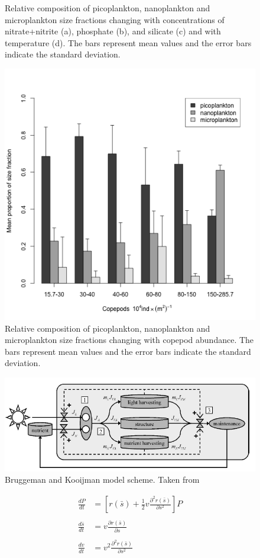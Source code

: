 \begin{figure}
\caption[Scheme]{\small {Relative composition of picoplankton, nanoplankton and microplankton size fractions changing with concentrations of nitrate+nitrite (a), phosphate (b), and silicate (c) and with temperature (d). The bars represent mean values and the error bars indicate the standard deviation.}}
\label{response1}
\end{figure}

\begin{figure}
\centering
\includegraphics[trim = 0mm 0mm 0mm 15mm, clip, width=0.6\linewidth]{./Chp2-Pre/amt_zoo_bars2.png}
\caption[Scheme]{\small {Relative composition of picoplankton, nanoplankton and microplankton size fractions changing with copepod abundance. The bars represent mean values and the error bars indicate the standard deviation.}}
\label{response2}
\end{figure}

\begin{figure}
\centering
\includegraphics[trim = 0mm 0mm 0mm 0mm, clip, width=1\linewidth]{./Chp3-Further/Bruggeman-2007.png}
\caption[Scheme]{\small {Bruggeman and Kooijman model scheme. Taken from \citet{Bruggeman2007}}}
\label{Bruggeman}
\end{figure}


\begin{align*}
\frac{dP}{dt} & = \left[r(\bar{s})+\frac{1}{2}v\frac{\partial^{2} r(\bar{s})}{\partial s^{2}}\right]P \nonumber \\
& \nonumber \\
\frac{d\bar{s}}{dt} & = v\frac{\partial r(\bar{s})}{\partial s}\nonumber \\
&\nonumber \\
\frac{dv}{dt} & = v^{2}\frac{\partial^{2} r(\bar{s})}{\partial s^{2}}\nonumber\\
\end{align*}

